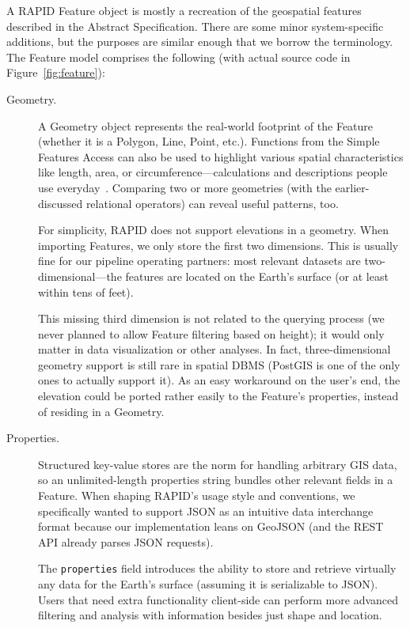 A RAPID Feature object is mostly a recreation of the geospatial features described in the Abstract Specification. There are some minor system-specific additions, but the purposes are similar enough that we borrow the terminology. The Feature model comprises the following (with actual source code in Figure~\ref{fig:feature}):

\begin{description}
  \item[Geometry.] 
  A Geometry object represents the real-world footprint of the Feature (whether it is a Polygon, Line, Point, etc.). Functions from the Simple Features Access can also be used to highlight various spatial characteristics like length, area, or circumference---calculations and descriptions people use everyday~\cite{SFA}. Comparing two or more geometries (with the earlier-discussed relational operators) can reveal useful patterns, too.
   
   For simplicity, RAPID does not support elevations in a geometry. When importing Features, we only store the first two dimensions. This is usually fine for our pipeline operating partners: most relevant datasets are two-dimensional---the features are located on the Earth's surface (or at least within tens of feet).
   
   This missing third dimension is not related to the querying process (we never planned to allow Feature filtering based on height); it would only matter in data visualization or other analyses. In fact, three-dimensional geometry support is still rare in spatial DBMS (PostGIS is one of the only ones to actually support it). As an easy workaround on the user's end, the elevation could be ported rather easily to the Feature's properties, instead of residing in a Geometry.
  
  \item[Properties.] 
  Structured key-value stores are the norm for handling arbitrary GIS data, so an unlimited-length properties string bundles other relevant fields in a Feature. When shaping RAPID's usage style and conventions, we specifically wanted to support JSON as an intuitive data interchange format because our implementation leans on GeoJSON (and the REST API already parses JSON requests).
  
  The \texttt{properties} field introduces the ability to store and retrieve virtually any data for the Earth's surface (assuming it is serializable to JSON). Users that need extra functionality client-side can perform more advanced filtering and analysis with information besides just shape and location.
  

\end{description}
